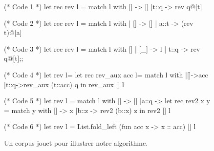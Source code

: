 \begin{figure}
\begin{multicols}{2}
\begin{ocaml}
(* Code 1 *)
let rec rev l = match l with
    [] -> []
  |t::q -> rev q@[t]

(* Code 2 *)
let rec rev l =
  match l with
  | [] -> []
  | a::t -> (rev t)@[a]

(* Code 3 *)
let rec rev l = match l with
    [] | [_] -> l
  | t::q -> rev q@[t];;
\end{ocaml}
\begin{ocaml}
(* Code 4 *)
let rev l=
  let rec rev_aux acc l=
    match l with
    |[]->acc
    |t::q->rev_aux (t::acc) q
  in rev_aux [] l

(* Code 5 *)
let rev l =
  match l with
    [] -> []
  |a::q -> let rec rev2 x y = match y with
        [] -> x
      |b::z -> rev2 (b::x) z in rev2 [] l

(* Code 6 *)
let rev l =
  List.fold_left (fun acc x -> x :: acc) [] l
\end{ocaml}
\end{multicols}
\label{fig:example:sources}
\caption{Un corpus jouet pour illustrer notre algorithme.}
\end{figure}
